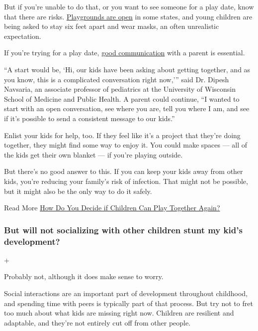 But if you're unable to do that, or you want to see someone for a play
date, know that there are risks.
\href{https://www.nytimes3xbfgragh.onion/2020/06/11/parenting/playgrounds-reopen-safety-coronavirus.html}{Playgrounds
are open} in some states, and young children are being asked to stay six
feet apart and wear masks, an often unrealistic expectation.

If you're trying for a play date,
\href{https://www.nytimes3xbfgragh.onion/2020/06/29/parenting/family-socially-distancing-coronavirus.html}{good
communication} with a parent is essential.

``A start would be, `Hi, our kids have been asking about getting
together, and as you know, this is a complicated conversation right
now,''' said Dr. Dipesh Navsaria, an associate professor of pediatrics
at the University of Wisconsin School of Medicine and Public Health. A
parent could continue, ``I wanted to start with an open conversation,
see where you are, tell you where I am, and see if it's possible to send
a consistent message to our kids.''

Enlist your kids for help, too. If they feel like it's a project that
they're doing together, they might find some way to enjoy it. You could
make spaces --- all of the kids get their own blanket --- if you're
playing outside.

But there's no good answer to this. If you can keep your kids away from
other kids, you're reducing your family's risk of infection. That might
not be possible, but it might also be the only way to do it safely.

 Read More
\href{https://www.nytimes3xbfgragh.onion/2020/06/01/well/family/coronavirus-reopening-children-parents-play-dates.html}{How
Do You Decide if Children Can Play Together Again?}

\hypertarget{but-will-not-socializing-with-other-children-stunt-my-kids-development}{%
\subsubsection{But will not socializing with other children stunt my
kid's
development?}\label{but-will-not-socializing-with-other-children-stunt-my-kids-development}}

+

Probably not, although it does make sense to worry.

Social interactions are an important part of development throughout
childhood, and spending time with peers is typically part of that
process. But try not to fret too much about what kids are missing right
now. Children are resilient and adaptable, and they're not entirely cut
off from other people.

